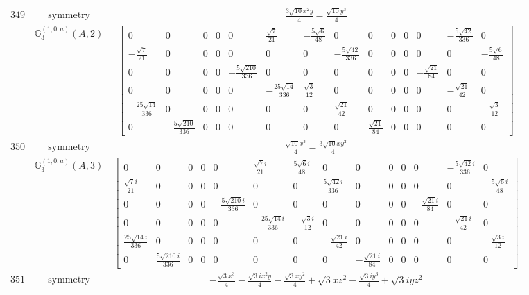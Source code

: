 \documentclass[fleqn,8pt,landscape]{jsarticle}
\begin{document}
\begin{longtable}{ccc}
$ 349 $ & $ \text{symmetry} $ & $ \frac{3 \sqrt{10} x^{2} y}{4} - \frac{\sqrt{10} y^{3}}{4} $ \\
$  $ & $ \mathbb{G}_{3}^{(1,0;a)}(A,2) $ & $ \begin{bmatrix} 0 & 0 & 0 & 0 & 0 & \frac{\sqrt{7}}{21} & - \frac{5 \sqrt{6}}{48} & 0 & 0 & 0 & 0 & 0 & - \frac{5 \sqrt{42}}{336} & 0 \\ - \frac{\sqrt{7}}{21} & 0 & 0 & 0 & 0 & 0 & 0 & - \frac{5 \sqrt{42}}{336} & 0 & 0 & 0 & 0 & 0 & - \frac{5 \sqrt{6}}{48} \\ 0 & 0 & 0 & 0 & - \frac{5 \sqrt{210}}{336} & 0 & 0 & 0 & 0 & 0 & 0 & - \frac{\sqrt{21}}{84} & 0 & 0 \\ 0 & 0 & 0 & 0 & 0 & - \frac{25 \sqrt{14}}{336} & \frac{\sqrt{3}}{12} & 0 & 0 & 0 & 0 & 0 & - \frac{\sqrt{21}}{42} & 0 \\ - \frac{25 \sqrt{14}}{336} & 0 & 0 & 0 & 0 & 0 & 0 & \frac{\sqrt{21}}{42} & 0 & 0 & 0 & 0 & 0 & - \frac{\sqrt{3}}{12} \\ 0 & - \frac{5 \sqrt{210}}{336} & 0 & 0 & 0 & 0 & 0 & 0 & \frac{\sqrt{21}}{84} & 0 & 0 & 0 & 0 & 0 \end{bmatrix} $ \\ \hline
$ 350 $ & $ \text{symmetry} $ & $ \frac{\sqrt{10} x^{3}}{4} - \frac{3 \sqrt{10} x y^{2}}{4} $ \\
$  $ & $ \mathbb{G}_{3}^{(1,0;a)}(A,3) $ & $ \begin{bmatrix} 0 & 0 & 0 & 0 & 0 & \frac{\sqrt{7} i}{21} & \frac{5 \sqrt{6} i}{48} & 0 & 0 & 0 & 0 & 0 & - \frac{5 \sqrt{42} i}{336} & 0 \\ \frac{\sqrt{7} i}{21} & 0 & 0 & 0 & 0 & 0 & 0 & \frac{5 \sqrt{42} i}{336} & 0 & 0 & 0 & 0 & 0 & - \frac{5 \sqrt{6} i}{48} \\ 0 & 0 & 0 & 0 & - \frac{5 \sqrt{210} i}{336} & 0 & 0 & 0 & 0 & 0 & 0 & - \frac{\sqrt{21} i}{84} & 0 & 0 \\ 0 & 0 & 0 & 0 & 0 & - \frac{25 \sqrt{14} i}{336} & - \frac{\sqrt{3} i}{12} & 0 & 0 & 0 & 0 & 0 & - \frac{\sqrt{21} i}{42} & 0 \\ \frac{25 \sqrt{14} i}{336} & 0 & 0 & 0 & 0 & 0 & 0 & - \frac{\sqrt{21} i}{42} & 0 & 0 & 0 & 0 & 0 & - \frac{\sqrt{3} i}{12} \\ 0 & \frac{5 \sqrt{210} i}{336} & 0 & 0 & 0 & 0 & 0 & 0 & - \frac{\sqrt{21} i}{84} & 0 & 0 & 0 & 0 & 0 \end{bmatrix} $ \\ \hline
$ 351 $ & $ \text{symmetry} $ & $ - \frac{\sqrt{3} x^{3}}{4} - \frac{\sqrt{3} i x^{2} y}{4} - \frac{\sqrt{3} x y^{2}}{4} + \sqrt{3} x z^{2} - \frac{\sqrt{3} i y^{3}}{4} + \sqrt{3} i y z^{2} $ \\

\end{longtable}
\end{document}
